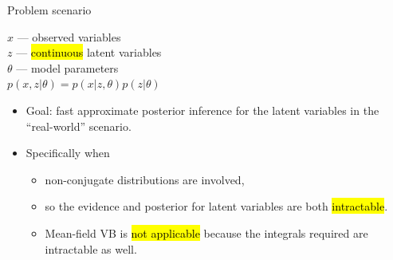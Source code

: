 \documentclass[unicode,11pt]{beamer}
\begin{document}
\begin{frame}[fragile]{Problem scenario}
  \begin{center}
    \begin{minipage}[t]{.3\linewidth}
    \end{minipage}
    \begin{minipage}[t]{.55\linewidth}
      $x$ --- observed variables\\
      $z$ --- \hl{continuous} latent variables\\
      $\theta$ --- model parameters\\
      $p(x, z|\theta) = p(x|z, \theta) p(z|\theta)$ %
    \end{minipage}
  \end{center}

  \begin{itemize}
  \item Goal: fast approximate posterior inference for the latent variables
    in the ``real-world'' scenario.
  \item Specifically when
    \begin{itemize}
    \item non-conjugate distributions are involved,
    \item so the evidence and posterior for latent variables are both
      \hl{intractable}.
    \item Mean-field VB is \hl{not applicable} because the integrals
      required are intractable as well.
    \end{itemize}
  \end{itemize}

\end{frame}
\end{document}
